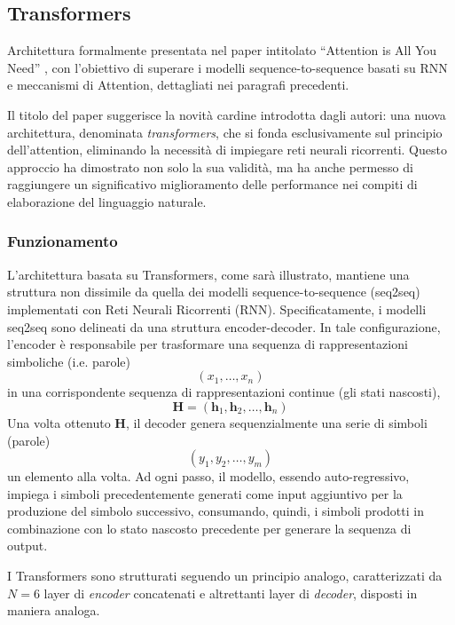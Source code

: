 \documentclass[12pt,a4paper,twoside,openright]{book}
\begin{document}
\subsection{Transformers}
Architettura formalmente presentata nel paper intitolato ``Attention is All You Need'' \cite{DBLP:journals/corr/VaswaniSPUJGKP17}, con l'obiettivo di superare i modelli sequence-to-sequence basati su RNN e meccanismi di Attention, dettagliati nei paragrafi precedenti. 

Il titolo del paper suggerisce la novità cardine introdotta dagli autori: una nuova architettura, denominata \emph{transformers}, che si fonda esclusivamente sul principio dell'attention, eliminando la necessità di impiegare reti neurali ricorrenti. Questo approccio ha dimostrato non solo la sua validità, ma ha anche permesso di raggiungere un significativo miglioramento delle performance nei compiti di elaborazione del linguaggio naturale.

\subsubsection{Funzionamento} L'architettura basata su Transformers, come sarà illustrato, mantiene una struttura non dissimile da quella dei modelli sequence-to-sequence (seq2seq) implementati con Reti Neurali Ricorrenti (RNN). Specificatamente, i modelli seq2seq sono delineati da una struttura encoder-decoder. In tale configurazione, l'encoder è responsabile per trasformare una sequenza di rappresentazioni simboliche (i.e. parole) 
\begin{equation*}
(x_1, \dots, x_n)
\end{equation*}
in una corrispondente sequenza di rappresentazioni continue (gli stati nascosti),
\begin{equation*}
\mathbf{H} = (\mathbf{h}_1, \mathbf{h}_2, \dots, \mathbf{h}_n)
\end{equation*}
Una volta ottenuto $\mathbf{H}$, il decoder genera sequenzialmente una serie di simboli (parole)
\begin{equation*}
(y_1,y_2, \dots, y_m)
\end{equation*}
un elemento alla volta. Ad ogni passo, il modello, essendo auto-regressivo, impiega i simboli precedentemente generati come input aggiuntivo per la produzione del simbolo successivo, consumando, quindi, i simboli prodotti in combinazione con lo stato nascosto precedente per generare la sequenza di output.

I Transformers sono strutturati seguendo un principio analogo, caratterizzati da $N=6$ layer di \emph{encoder} concatenati e altrettanti layer di \emph{decoder}, disposti in maniera analoga.
\end{document}
